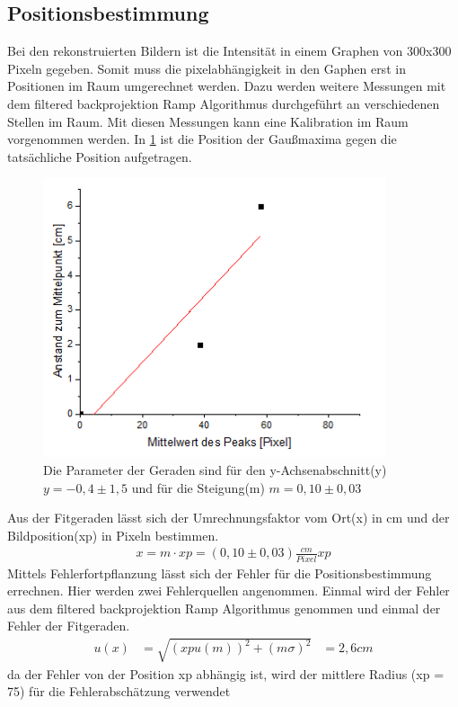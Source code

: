\subsection{Positionsbestimmung}
Bei den rekonstruierten Bildern ist die Intensität in einem Graphen von 300x300 Pixeln gegeben. Somit muss die pixelabhängigkeit in den Gaphen erst in Positionen im Raum umgerechnet werden. Dazu werden weitere Messungen mit dem filtered backprojektion Ramp Algorithmus durchgeführt an  verschiedenen Stellen im Raum. Mit diesen Messungen kann eine Kalibration im Raum vorgenommen werden. In \cref{oop} ist die Position der Gaußmaxima gegen die tatsächliche Position aufgetragen.
\begin{figure}[h!]
	\centering
	\includegraphics[width=0.9\textwidth]{Position.png}
	\caption{Die Parameter der Geraden sind für den y-Achsenabschnitt(y) $y = -0,4 \pm 1,5$ und für die Steigung(m) $m = 0,10 \pm 0,03 $}
	\label{oop}
\end{figure}
Aus der Fitgeraden lässt sich der Umrechnungsfaktor vom Ort(x) in cm und der Bildposition(xp) in Pixeln bestimmen.
\begin{align}
	x = m \cdot xp =  (0,10 \pm 0,03)\frac{cm}{Pixel} xp
\end{align}
Mittels Fehlerfortpflanzung lässt sich der Fehler für die Positionsbestimmung errechnen.
Hier werden zwei Fehlerquellen angenommen. Einmal wird der Fehler aus dem filtered backprojektion Ramp Algorithmus genommen und einmal der Fehler der Fitgeraden.
\begin{align}
	u(x) &= \sqrt{(xpu(m))^2 + (m\sigma)^2} &= 2,6cm
\end{align}
da der Fehler von der Position xp abhängig ist, wird der mittlere Radius (xp = 75) für die Fehlerabschätzung verwendet









